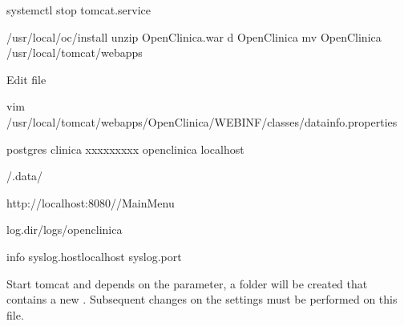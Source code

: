 \documentclass[letterpaper,10pt,english]{sphinxmanual}
\begin{document}
%
\begin{sphinxVerbatim}[commandchars=\\\{\}]
systemctl stop tomcat.service
\end{sphinxVerbatim}

%
\begin{sphinxVerbatim}[commandchars=\\\{\}]
 /usr/local/oc/install
unzip OpenClinica.war \PYGZhy{}d OpenClinica
mv OpenClinica /usr/local/tomcat/webapps
\end{sphinxVerbatim}

Edit  file

%
\begin{sphinxVerbatim}[commandchars=\\\{\}]
vim /usr/local/tomcat/webapps/OpenClinica/WEB\PYGZhy{}INF/classes/datainfo.properties
\end{sphinxVerbatim}

%
\begin{sphinxVerbatim}[commandchars=\\\{\}]
postgres
clinica
xxxxxxxxx
openclinica
localhost

/.data/

http://localhost:8080//MainMenu

log.dir/logs/openclinica

info
syslog.hostlocalhost
syslog.port
\end{sphinxVerbatim}

Start tomcat and depends on the  parameter, a folder will be created that contains a new . Subsequent changes on the settings must be performed on this file.
\end{document}
